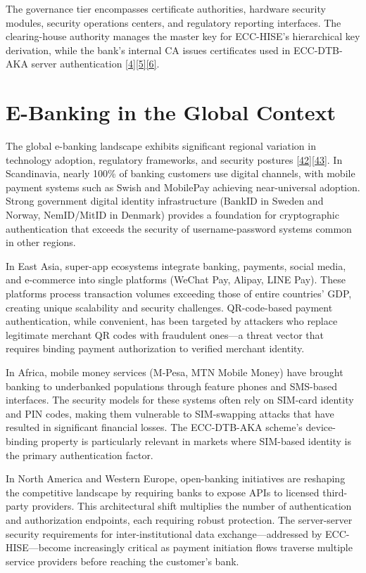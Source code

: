 \indent The governance tier encompasses certificate authorities, hardware security modules, security operations centers, and regulatory reporting interfaces. The clearing-house authority manages the master key for ECC-HISE's hierarchical key derivation, while the bank's internal CA issues certificates used in ECC-DTB-AKA server authentication \hyperref[ref:4]{[4]}\hyperref[ref:5]{[5]}\hyperref[ref:6]{[6]}.

\section{E-Banking in the Global Context}

\indent The global e-banking landscape exhibits significant regional variation in technology adoption, regulatory frameworks, and security postures \hyperref[ref:42]{[42]}\hyperref[ref:43]{[43]}. In Scandinavia, nearly 100\% of banking customers use digital channels, with mobile payment systems such as Swish and MobilePay achieving near-universal adoption. Strong government digital identity infrastructure (BankID in Sweden and Norway, NemID/MitID in Denmark) provides a foundation for cryptographic authentication that exceeds the security of username-password systems common in other regions.

\indent In East Asia, super-app ecosystems integrate banking, payments, social media, and e-commerce into single platforms (WeChat Pay, Alipay, LINE Pay). These platforms process transaction volumes exceeding those of entire countries' GDP, creating unique scalability and security challenges. QR-code-based payment authentication, while convenient, has been targeted by attackers who replace legitimate merchant QR codes with fraudulent ones---a threat vector that requires binding payment authorization to verified merchant identity.

\indent In Africa, mobile money services (M-Pesa, MTN Mobile Money) have brought banking to underbanked populations through feature phones and SMS-based interfaces. The security models for these systems often rely on SIM-card identity and PIN codes, making them vulnerable to SIM-swapping attacks that have resulted in significant financial losses. The ECC-DTB-AKA scheme's device-binding property is particularly relevant in markets where SIM-based identity is the primary authentication factor.

\indent In North America and Western Europe, open-banking initiatives are reshaping the competitive landscape by requiring banks to expose APIs to licensed third-party providers. This architectural shift multiplies the number of authentication and authorization endpoints, each requiring robust protection. The server-server security requirements for inter-institutional data exchange---addressed by ECC-HISE---become increasingly critical as payment initiation flows traverse multiple service providers before reaching the customer's bank.


